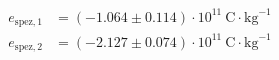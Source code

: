 \begin{align*}
e_{\text{spez},1} &= (-1.064\pm0.114)\cdot 10^{11}~\text{C}\cdot \text{kg}^{-1} \\
e_{\text{spez},2} &= (-2.127\pm0.074)\cdot 10^{11}~\text{C}\cdot \text{kg}^{-1} 
\end{align*}
